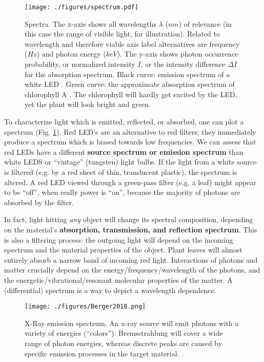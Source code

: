 \begin{figure}[htbp]
\centering
\texttt{[image: ./figures/spectrum.pdf]}
\caption{\label{fig:spectrum}Spectra. The x-axis shows all wavelengths \(\lambda\) (\(nm\)) of relevance (in this case the range of visible light, for illustration). Related to wavelength and therefore viable axis label alternatives are frequency (\(Hz\)) and photon energy (\(keV\)). The y-axis shows photon occurrence probability, or normalized intensity \(I\), or the intensity difference \(\Delta I\) for the absorption spectrum. Black curve: emission spectrum of a white LED \citep{Tanabe2005}. Green curve: the approximate absorption spectrum of chlorophyll A \citep{Zscheile1934}. The chlorophyll will hardly get excited by the LED, yet the plant will look bright and green.}
\end{figure}


To characterize light which is emitted, reflected, or absorbed, one can plot a spectrum (Fig. \ref{fig:spectrum}).
Red LED's are an alternative to red filters: they immediately produce a spectrum which is biased towards low frequencies.
We can assess that red LEDs have a different \textbf{source spectrum or emission spectrum} than white LEDS or ``vintage'' (tungsten) light bulbs.
If the light from a white source is filtered (e.g. by a red sheet of thin, translucent plastic), the spectrum is altered.
A red LED viewed through a green-pass filter (e.g. a leaf) might appear to be ``off'', when really power is ``on'', because the majority of photons are absorbed by the filter.

In fact, light hitting \emph{any} object will change its spectral composition, depending on the material's \textbf{absorption, transmission, and reflection spectrum}.
This is also a filtering process: the outgoing light will depend on the incoming spectrum and the material properties of the object.
Plant leaves will almost entirely absorb a narrow band of incoming red light.
Interactions of photons and matter crucially depend on the energy/frequency/wavelength of the photons, and the energetic/vibrational/resonant molecular properties of the matter.
A (differential) spectrum is a way to depict a wavelength dependence.


\begin{figure}[htbp]
\centering
\texttt{[image: ./figures/Berger2018.png]}
\caption{\label{fig:xray_emission}X-Ray emission spectrum. An x-ray source will emit photons with a variety of energies (``colors''). Bremsstrahlung will cover a wide range of photon energies, whereas discrete peaks are caused by specific emission processes in the target material. \citep[taken from ][, creative commons license]{Berger2018fig8}.}
\end{figure}

